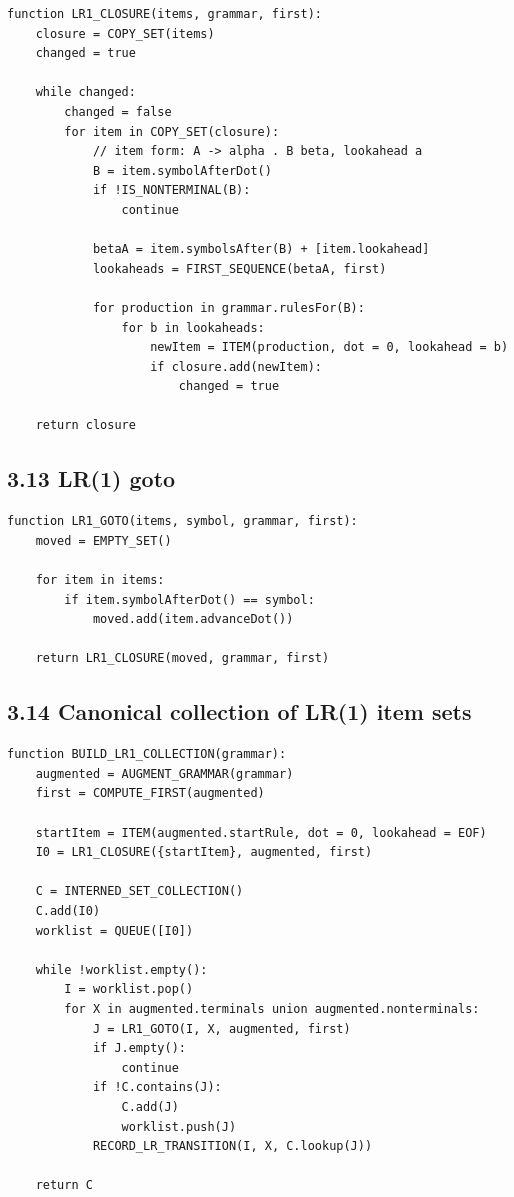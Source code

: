 \documentclass[10pt,letterpaper]{article}
\begin{document}
\begin{verbatim}
function LR1_CLOSURE(items, grammar, first):
    closure = COPY_SET(items)
    changed = true

    while changed:
        changed = false
        for item in COPY_SET(closure):
            // item form: A -> alpha . B beta, lookahead a
            B = item.symbolAfterDot()
            if !IS_NONTERMINAL(B):
                continue

            betaA = item.symbolsAfter(B) + [item.lookahead]
            lookaheads = FIRST_SEQUENCE(betaA, first)

            for production in grammar.rulesFor(B):
                for b in lookaheads:
                    newItem = ITEM(production, dot = 0, lookahead = b)
                    if closure.add(newItem):
                        changed = true

    return closure
\end{verbatim}

\subsection*{3.13 LR(1) goto}
{}

\begin{verbatim}
function LR1_GOTO(items, symbol, grammar, first):
    moved = EMPTY_SET()

    for item in items:
        if item.symbolAfterDot() == symbol:
            moved.add(item.advanceDot())

    return LR1_CLOSURE(moved, grammar, first)
\end{verbatim}

\subsection*{3.14 Canonical collection of LR(1) item sets}
{}

\begin{verbatim}
function BUILD_LR1_COLLECTION(grammar):
    augmented = AUGMENT_GRAMMAR(grammar)
    first = COMPUTE_FIRST(augmented)

    startItem = ITEM(augmented.startRule, dot = 0, lookahead = EOF)
    I0 = LR1_CLOSURE({startItem}, augmented, first)

    C = INTERNED_SET_COLLECTION()
    C.add(I0)
    worklist = QUEUE([I0])

    while !worklist.empty():
        I = worklist.pop()
        for X in augmented.terminals union augmented.nonterminals:
            J = LR1_GOTO(I, X, augmented, first)
            if J.empty():
                continue
            if !C.contains(J):
                C.add(J)
                worklist.push(J)
            RECORD_LR_TRANSITION(I, X, C.lookup(J))

    return C
\end{verbatim}
\end{document}
